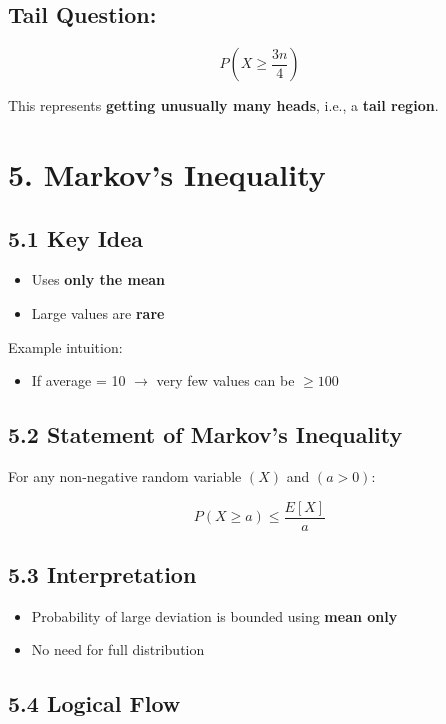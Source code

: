 \documentclass[12pt]{article}
\begin{document}
\subsection*{Tail Question:}

\[
P\left(X \ge \frac{3n}{4}\right)
\]

This represents \textbf{getting unusually many heads}, i.e., a \textbf{tail region}. 

\section*{5. Markov's Inequality}

\subsection*{5.1 Key Idea}

\begin{itemize}
\item Uses \textbf{only the mean}
\item Large values are \textbf{rare}
\end{itemize}

Example intuition:

\begin{itemize}
\item If average = 10 $\rightarrow$ very few values can be $\ge 100$ 
\end{itemize}

\subsection*{5.2 Statement of Markov's Inequality}

For any non-negative random variable $(X)$ and $(a > 0)$:

\[
P(X \ge a) \le \frac{E[X]}{a}
\]

\subsection*{5.3 Interpretation}

\begin{itemize}
\item Probability of large deviation is bounded using \textbf{mean only}
\item No need for full distribution
\end{itemize}

\subsection*{5.4 Logical Flow}
\end{document}
